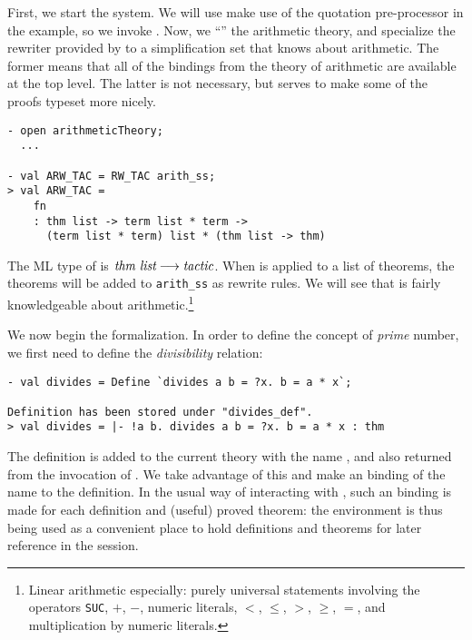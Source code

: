 First, we start the system. We will use make use of the quotation
pre-processor in the example, so we invoke
.  Now, we ``'' the
arithmetic theory, and specialize the rewriter provided by
 to a simplification set that knows about arithmetic.  The
former means that all of the \ML{} bindings from the \HOL{} theory of
arithmetic are available at the top level.  The latter is not
necessary, but serves to make some of the proofs typeset more nicely.
\begin{session}
\begin{verbatim}
- open arithmeticTheory;
  ...

- val ARW_TAC = RW_TAC arith_ss;
> val ARW_TAC =
    fn
    : thm list -> term list * term ->
      (term list * term) list * (thm list -> thm)
\end{verbatim}
\end{session}
The ML type of  is $\mbox{\it thm list} \longrightarrow
\mbox{\it tactic}$. When  is applied to a list of theorems, the
theorems will be added to \verb+arith_ss+ as rewrite rules.  We will see
that  is fairly knowledgeable about
arithmetic.\footnote{Linear arithmetic especially: purely universal
statements involving the operators {\tt SUC}, $+$, $-$, numeric
literals, $<$, $\leq$, $>$, $\geq$, $=$, and multiplication by numeric
literals.}

We now begin the formalization. In order to define the concept of  \emph
{prime} number, we first need to define the \emph{divisibility} relation:

\begin{session}\begin{verbatim}
- val divides = Define `divides a b = ?x. b = a * x`;

Definition has been stored under "divides_def".
> val divides = |- !a b. divides a b = ?x. b = a * x : thm
\end{verbatim}\end{session}
    The definition is added to the current theory with the name
    , and also returned from the invocation of
    . We take advantage of this and make an \ML{} binding
    of the name  to the definition. In the usual way of
    interacting with \HOL, such an \ML{} binding is made for each
    definition and (useful) proved theorem: the \ML{} environment is
    thus being used as a convenient place to hold definitions and
    theorems for later reference in the session.

